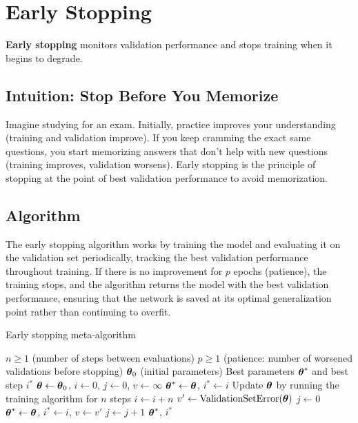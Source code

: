 
\section{Early Stopping }
\label{sec:early-stopping}

\textbf{Early stopping} monitors validation performance and stops training when it begins to degrade.

\subsection{Intuition: Stop Before You Memorize}

Imagine studying for an exam. Initially, practice improves your understanding (training and validation improve). If you keep cramming the exact same questions, you start memorizing answers that don't help with new questions (training improves, validation worsens). Early stopping is the principle of stopping at the point of best validation performance to avoid memorization.

\subsection{Algorithm}

The early stopping algorithm works by training the model and evaluating it on the validation set periodically, tracking the best validation performance throughout training. If there is no improvement for $p$ epochs (patience), the training stops, and the algorithm returns the model with the best validation performance, ensuring that the network is saved at its optimal generalization point rather than continuing to overfit.

\begin{algorithm}
\caption{Early stopping meta-algorithm}
\label{alg:early-stopping}
\begin{algorithmic}
\Require $n \geq 1$ (number of steps between evaluations)
\Require $p \geq 1$ (patience: number of worsened validations before stopping)
\Require $\boldsymbol{\theta}_0$ (initial parameters)
\Ensure Best parameters $\boldsymbol{\theta}^*$ and best step $i^*$
\State $\boldsymbol{\theta} \gets \boldsymbol{\theta}_0$, $i \gets 0$, $j \gets 0$, $v \gets \infty$
\State $\boldsymbol{\theta}^* \gets \boldsymbol{\theta}$, $i^* \gets i$
    \State Update $\boldsymbol{\theta}$ by running the training algorithm for $n$ steps
    \State $i \gets i + n$
    \State $v' \gets \text{ValidationSetError}(\boldsymbol{\theta})$
        \State $j \gets 0$
        \State $\boldsymbol{\theta}^* \gets \boldsymbol{\theta}$, $i^* \gets i$, $v \gets v'$
    \Else
        \State $j \gets j + 1$
    \EndIf
\EndWhile
\State \Return $\boldsymbol{\theta}^*$, $i^*$
\end{algorithmic}
\end{algorithm}

